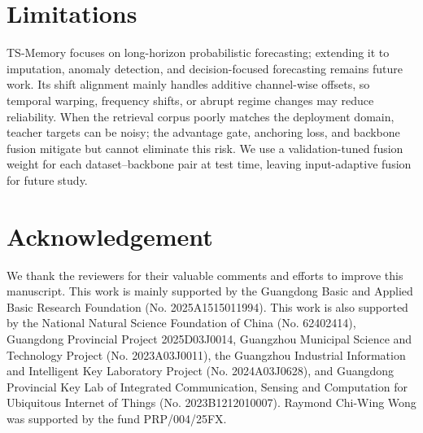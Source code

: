 \section*{Limitations}

TS-Memory focuses on long-horizon probabilistic forecasting; extending it to imputation, anomaly detection, and decision-focused forecasting remains future work. 
Its shift alignment mainly handles additive channel-wise offsets, so temporal warping, frequency shifts, or abrupt regime changes may reduce reliability. 
When the retrieval corpus poorly matches the deployment domain, teacher targets can be noisy; the advantage gate, anchoring loss, and backbone fusion mitigate but cannot eliminate this risk. 
We use a validation-tuned fusion weight for each dataset--backbone pair at test time, leaving input-adaptive fusion for future study.

\section*{Acknowledgement}

We thank the reviewers for their valuable comments and efforts to improve this manuscript. This work is mainly supported by the Guangdong Basic and Applied Basic Research Foundation (No. 2025A1515011994). This work is also supported by the National Natural Science Foundation of China (No. 62402414), Guangdong Provincial Project 2025D03J0014, Guangzhou Municipal Science and Technology Project (No. 2023A03J0011), the Guangzhou Industrial Information and Intelligent Key Laboratory Project (No. 2024A03J0628), and Guangdong Provincial Key Lab of Integrated Communication, Sensing and Computation for Ubiquitous Internet of Things (No. 2023B1212010007). Raymond Chi-Wing Wong was supported by the fund PRP/004/25FX.
